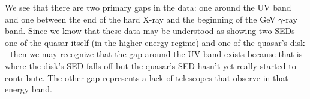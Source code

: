 \documentclass[12pt]{article}
\begin{document}
\begin{onehalfspacing}
We see that there are two primary gaps in the data: one around the UV band and one between the end of the hard X-ray and the beginning of the GeV $\gamma$-ray band. Since we know that these data may be understood as showing two SEDs - one of the quasar itself (in the higher energy regime) and one of the quasar's disk - then we may recognize that the gap around the UV band exists because that is where the disk's SED falls off but the quasar's SED hasn't yet really started to contribute. The other gap represents a lack of telescopes that observe in that energy band.








\end{onehalfspacing}
\end{document}
